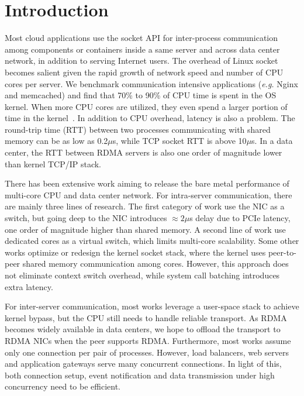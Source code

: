 \section{Introduction}
\label{sec:intro}

Most cloud applications use the socket API for inter-process communication among components or containers inside a same server and across data center network, in addition to serving Internet users. The overhead of Linux socket becomes salient given the rapid growth of network speed and number of CPU cores per server. We benchmark communication intensive applications (\textit{e.g.} Nginx and memcached) and find that 70\% to 90\% of CPU time is spent in the OS kernel. When more CPU cores are utilized, they even spend a larger portion of time in the kernel~\cite{boyd2010analysis}. In addition to CPU overhead, latency is also a problem. The round-trip time (RTT) between two processes communicating with shared memory can be as low as 0.2$\mu$s, while TCP socket RTT is above 10$\mu$s. In a data center, the RTT between RDMA servers is also one order of magnitude lower than kernel TCP/IP stack.

There has been extensive work aiming to release the bare metal performance of multi-core CPU and data center network. For intra-server communication, there are mainly three lines of research. The first category of work use the NIC as a switch, but going deep to the NIC introduces $\approx2 \mu$s delay due to PCIe latency, one order of magnitude higher than shared memory. A second line of work use dedicated cores as a virtual switch, which limits multi-core scalability. Some other works optimize or redesign the kernel socket stack, where the kernel uses peer-to-peer shared memory communication among cores. However, this approach does not eliminate context switch overhead, while system call batching introduces extra latency.

For inter-server communication, most works leverage a user-space stack to achieve kernel bypass, but the CPU still needs to handle reliable transport. As RDMA becomes widely available in data centers, we hope to offload the transport to RDMA NICs when the peer supports RDMA. Furthermore, most works assume only one connection per pair of processes. However, load balancers, web servers and application gateways serve many concurrent connections. In light of this, both connection setup, event notification and data transmission under high concurrency need to be efficient.


